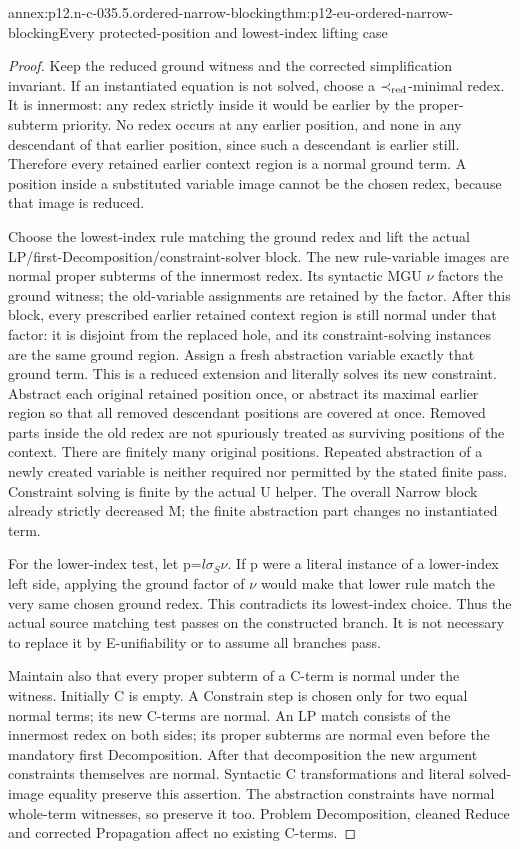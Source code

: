 \begin{annexitem}{annex:p12.n-c-035.5.ordered-narrow-blocking}{thm:p12-eu-ordered-narrow-blocking}{Every protected-position and lowest-index lifting case}
\begin{proof}
Keep the reduced ground witness and the corrected simplification
invariant. If an instantiated equation is not solved, choose a
\(\prec_{\rm red}\)-minimal redex. It is innermost: any redex
strictly inside it would be earlier by the proper-subterm priority.
No redex occurs at any earlier position, and none in any descendant
of that earlier position, since such a descendant is earlier still.
Therefore every retained earlier context region is a normal ground
term. A position inside a substituted variable image cannot be the
chosen redex, because that image is reduced.

Choose the lowest-index rule matching the ground redex and lift
the actual LP/first-Decomposition/constraint-solver block. The new
rule-variable images are normal proper subterms of the innermost
redex. Its syntactic MGU \(\nu\) factors the ground witness;
the old-variable assignments are retained by the factor. After
this block, every prescribed earlier retained context region is
still normal under that factor: it is disjoint from the replaced
hole, and its constraint-solving instances are the same ground
region. Assign a fresh abstraction variable exactly that ground
term. This is a reduced extension and literally solves its new
constraint. Abstract each original retained position once, or
abstract its maximal earlier region so that all removed descendant
positions are covered at once. Removed parts inside the old redex
are not spuriously treated as surviving positions of the context.
There are finitely many original positions. Repeated abstraction
of a newly created variable is neither required nor permitted by
the stated finite pass. Constraint solving is finite by the actual
U helper. The overall Narrow block already strictly decreased M;
the finite abstraction part changes no instantiated term.

For the lower-index test, let p=\(l\sigma_S\nu\). If p were
a literal instance of a lower-index left side, applying the ground
factor of \(\nu\) would make that lower rule match the very
same chosen ground redex. This contradicts its lowest-index choice.
Thus the actual source matching test passes on the constructed
branch. It is not necessary to replace it by E-unifiability or
to assume all branches pass.

Maintain also that every proper subterm of a C-term is normal
under the witness. Initially C is empty. A Constrain step is
chosen only for two equal normal terms; its new C-terms are
normal. An LP match consists of the innermost redex on both
sides; its proper subterms are normal even before the mandatory
first Decomposition. After that decomposition the new argument
constraints themselves are normal. Syntactic C transformations
and literal solved-image equality preserve this assertion.
The abstraction constraints have normal whole-term witnesses,
so preserve it too. Problem Decomposition, cleaned Reduce and
corrected Propagation affect no existing C-terms.


\end{proof}
\end{annexitem}
